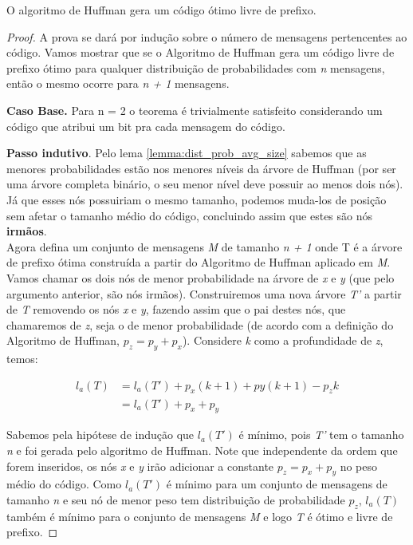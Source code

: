 \begin{theorem} O algoritmo de Huffman gera um código ótimo livre de prefixo.
\begin{proof}
A prova se dará por indução sobre o número de mensagens pertencentes ao código. 
Vamos mostrar que se o Algoritmo de Huffman gera um código livre de prefixo ótimo para qualquer distribuição de probabilidades com \emph{n} mensagens, então o mesmo ocorre para \emph{n + 1} mensagens.

\item \textbf{Caso Base.} Para n = 2 o teorema é trivialmente satisfeito considerando um código que atribui um bit pra cada mensagem do código.

\item \textbf{Passo indutivo}. Pelo lema \ref{lemma:dist_prob_avg_size} sabemos que as menores probabilidades estão nos menores níveis da árvore de Huffman (por ser uma árvore completa binário, o seu menor nível deve possuir ao menos dois nós). 
Já que esses nós possuiriam o mesmo tamanho, podemos muda-los de posição sem afetar o tamanho médio do código, concluindo assim que estes são nós \textbf{irmãos}.\\
Agora defina um conjunto de mensagens \emph{M} de tamanho \emph{n + 1} onde T é a árvore de prefixo ótima construída a partir do Algoritmo de Huffman aplicado em \emph{M}.
Vamos chamar os dois nós de menor probabilidade na árvore de \emph{x} e \emph{y} (que pelo argumento anterior, são nós irmãos). 
Construiremos uma nova árvore \emph{T'} a partir de \emph{T} removendo os nós \emph{x} e \emph{y}, fazendo assim que o pai destes nós, que chamaremos de \emph{z}, seja o de menor probabilidade (de acordo com a definição do Algoritmo de Huffman, $p_z = p_y + p_x$).
 Considere \emph{k} como a profundidade de \emph{z}, temos:

\begin{align*}
l_a(T) &= l_a(T') + p_x(k + 1) + py(k + 1) - p_z k \\
&= l_a(T') + p_x + p_y
\end{align*}

Sabemos pela hipótese de indução que $l_a(T')$ é mínimo, pois \emph{T'} tem o tamanho \emph{n} e foi gerada pelo algoritmo de Huffman. 
Note que independente da ordem que forem inseridos, os nós \emph{x} e \emph{y} irão adicionar a constante $p_z = p_x + p_y$ no peso médio do código. 
Como $l_a(T')$ é mínimo para um conjunto de mensagens de tamanho \emph{n} e seu nó de menor peso tem distribuição de probabilidade $p_z$, $l_a(T)$ também é mínimo para o conjunto de mensagens \emph{M} e logo \emph{T} é ótimo e livre de prefixo. 
\end{proof}
\end{theorem}

